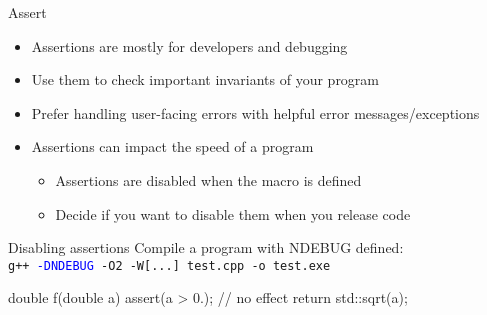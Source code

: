 \begin{frame}[fragile]
  \begin{goodpractice}{Assert}
    \begin{itemize}
      \item Assertions are mostly for developers and debugging
      \item Use them to check important invariants of your program
      \item Prefer handling user-facing errors with helpful error messages/exceptions
      \item Assertions can impact the speed of a program
      \begin{itemize}
        \item Assertions are disabled when the macro  is defined
        \item Decide if you want to disable them when you release code
      \end{itemize}
    \end{itemize}
  \end{goodpractice}
  \begin{exampleblock}{Disabling assertions}
    \small
    Compile a program with NDEBUG defined:\\
    \texttt{g++ \textcolor{blue}{-DNDEBUG} -O2 -W[...] test.cpp -o test.exe}

    \begin{cppcode*}{}
      double f(double a) {
        assert(a > 0.); // no effect
        return std::sqrt(a);
      }
    \end{cppcode*}
  \end{exampleblock}
\end{frame}

